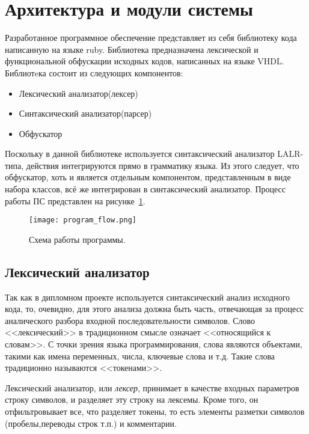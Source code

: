 
\section{Архитектура и модули системы} %
\label{sec:arch_and_mod}

Разработанное программное обеспечение представляет из себя библиотеку кода написанную на языке ruby.
Библиотека предназначена лексической и функциональной обфускации исходных кодов, написанных на языке VHDL.
Библиотeка состоит из следующих компонентов:
\begin{itemize}
\item Лексический анализатор(лексер)
\item Синтаксический анализатор(парсер)
\item Обфускатор
\end{itemize}
Поскольку в данной библиотеке используется синтаксический анализатор LALR-типа, действия интегрируются прямо в грамматику языка. Из этого следует, что обфускатор, хоть и является отдельным компонентом, представленным в виде набора классов, всё же интегрирован в синтаксический анализатор. Процесс работы ПС представлен на рисунке~\ref{fig:arch_and_mod::abstract_flow}.

\begin{landscape}
\thispagestyle{lscape}
\begin{figure}[ht]
\centering
  \texttt{[image: program\_flow.png]}
  \caption{ Схема работы программы. }
  \label{fig:arch_and_mod::abstract_flow}
\end{figure}
\end{landscape}


\subsection{Лексический анализатор}
\label{sub:arch_and_mod:lexer}

Так как в дипломном проекте используется синтаксический анализ исходного кода, то, очевидно, для этого анализа должна быть часть, отвечающая за процесс аналического разбора входной последовательности символов. Слово <<лексический>> в традиционном смысле означает <<относящийся к словам>>. С точки зрения языка программирования, слова являются объектами, такими как имена переменных, числа, ключевые слова и т.д. Такие слова традиционно называются <<токенами>>\cite{basic_compiler_design}.

Лексический анализатор, или \textit{лексер}, принимает в качестве входных параметров строку символов, и разделяет эту строку на лексемы. Кроме того, он отфильтровывает все, что разделяет токены, то есть элементы разметки символов (пробелы,переводы строк т.п.) и комментарии.

